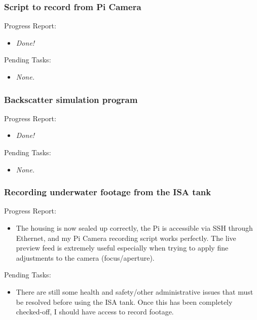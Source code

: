 \subsubsection{Script to record from Pi Camera}

Progress Report:

\begin{itemize}
    \item \textit{Done!}
\end{itemize}

Pending Tasks:

\begin{itemize}
    \item \textit{None.}
\end{itemize}




\subsubsection{Backscatter simulation program}

Progress Report:

\begin{itemize}
    \item \textit{Done!}
\end{itemize}

Pending Tasks:

\begin{itemize}
    \item \textit{None.}
\end{itemize}






\subsubsection{Recording underwater footage from the ISA tank}

Progress Report:

\begin{itemize}
    \item The housing is now sealed up correctly, the Pi is accessible via SSH through Ethernet, and my Pi Camera recording script works perfectly. The live preview feed is extremely useful especially when trying to apply fine adjustments to the camera (focus/aperture).
\end{itemize}

Pending Tasks:

\begin{itemize}
    \item There are still some health and safety/other administrative issues that must be resolved before using the ISA tank. Once this has been completely checked-off, I should have access to record footage.
\end{itemize}
